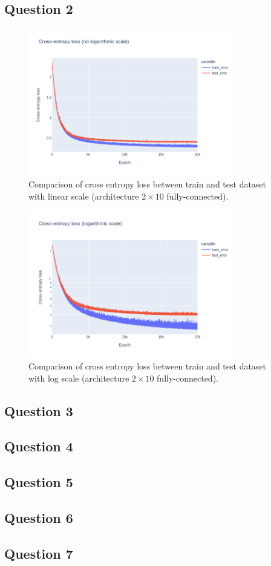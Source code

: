 \documentclass[12pt]{article}
\begin{document}
\subsection{Question 2}
\begin{figure}[ht]
    \centering
    \includegraphics[width=0.8\textwidth]{images/cross-entropy-comparison-2-10-10.png}
    \caption{Comparison of cross entropy loss between train and test dataset with linear scale (architecture $2 \times 10$ fully-connected).}
\end{figure}
\begin{figure}[ht]
    \centering
    \includegraphics[width=0.8\textwidth]{images/cross-entropy-comparison-2-10-10-log.png}
    \caption{Comparison of cross entropy loss between train and test dataset with log scale (architecture $2 \times 10$ fully-connected).}
\end{figure}
\subsection{Question 3}
\subsection{Question 4}
\subsection{Question 5}
\subsection{Question 6}
\subsection{Question 7}
\end{document}
